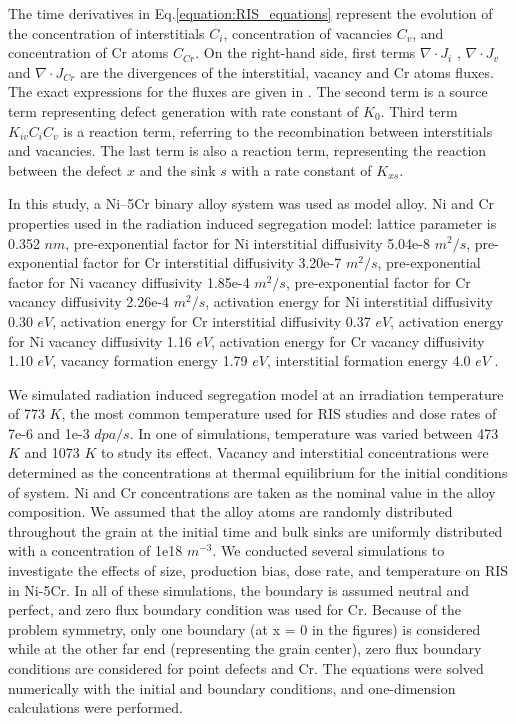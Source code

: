 \documentclass[utf8]{frontiersSCNS} %
\begin{document}
The time derivatives in Eq.\ref{equation:RIS_equations} represent the evolution of the concentration of interstitials ${C_i}$,  concentration of vacancies ${C_v}$,  and concentration of Cr atoms ${C_{Cr}}$.   On the right-hand side, first terms ${\nabla\cdot J_i}$ , ${\nabla\cdot J_v}$ and ${\nabla\cdot J_{Cr}}$ are the divergences of the interstitial, vacancy and Cr atoms fluxes. The exact expressions for the fluxes are given in \citep{barr_grain_2015}. The second term is a source term representing defect generation with rate constant of $K_0$. Third term ${K_{iv}C_iC_v}$ is a reaction term, referring to the recombination between interstitials and vacancies. The last term is also a reaction term, representing the reaction between the defect $x$ and the sink $s$ with a rate constant of ${K_{xs}}$.

In this study, a Ni–5Cr binary alloy system was used as model alloy. Ni and Cr properties used in the radiation induced segregation model: lattice parameter is 0.352 $nm$, pre-exponential factor for Ni interstitial diffusivity 5.04e-8 $m^2/s$, pre-exponential factor for Cr interstitial diffusivity 3.20e-7 $m^2/s$, pre-exponential factor for Ni vacancy diffusivity 1.85e-4 $m^2/s$, pre-exponential factor for Cr vacancy diffusivity 2.26e-4 $m^2/s$, activation energy for Ni interstitial diffusivity 0.30 $eV$, activation energy for Cr interstitial diffusivity 0.37 $eV$, activation energy for Ni vacancy diffusivity 1.16 $eV$, activation energy for Cr vacancy diffusivity 1.10 $eV$, vacancy formation energy 1.79 $eV$, interstitial formation energy 4.0 $eV$ \citep{barr_grain_2015}.

We simulated radiation induced segregation model at an irradiation temperature of 773 $K$, the most common temperature used for RIS studies \citep{allen_thermal_2007,wharry_systematic_2013,barnard_ab_2014,barr_grain_2015} and dose rates of 7e-6 and 1e-3 $dpa/s$. In one of simulations, temperature was varied between 473 $K$ and 1073 $K$ to study its effect. Vacancy and interstitial concentrations were determined as the concentrations at thermal equilibrium for the initial conditions of system. Ni and Cr concentrations are taken as the nominal value in the alloy composition. We assumed that the alloy atoms are randomly distributed throughout the grain at the initial time and bulk sinks are uniformly distributed with a concentration of 1e18 $m^{-3}$. We conducted several simulations to investigate the effects of size, production bias, dose rate, and temperature on RIS in Ni-5Cr. In all of these simulations, the boundary is assumed neutral and perfect, and zero flux boundary condition was used for Cr. Because of the problem symmetry, only one boundary (at x = 0 in the figures) is considered while at the other far end (representing the grain center), zero flux boundary conditions are considered for point defects and Cr. The equations were solved numerically with the initial and boundary conditions, and one-dimension calculations were performed.
\end{document}
